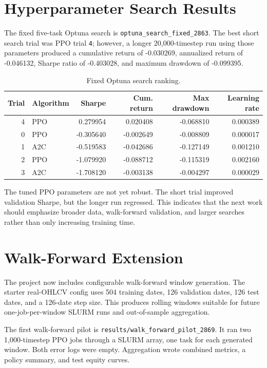 \documentclass[11pt]{article}
\begin{document}
\section{Hyperparameter Search Results}
The fixed five-task Optuna search is \texttt{optuna\_search\_fixed\_2863}. The best short search trial was PPO trial \texttt{4}; however, a longer 20,000-timestep run using those parameters produced a cumulative return of -0.030269, annualized return of -0.046132, Sharpe ratio of -0.403028, and maximum drawdown of -0.099395.

\begin{table}[h]
\centering
\caption{Fixed Optuna search ranking.}
\label{tab:optuna}
\begin{tabular}{rlrrrr}
\toprule
Trial & Algorithm & Sharpe & Cum. return & Max drawdown & Learning rate \\
\midrule
4 & PPO & 0.279954 & 0.020408 & -0.068810 & 0.000389 \\
0 & PPO & -0.305640 & -0.002649 & -0.008809 & 0.000017 \\
1 & A2C & -0.519583 & -0.042686 & -0.127149 & 0.001210 \\
2 & PPO & -1.079920 & -0.088712 & -0.115319 & 0.002160 \\
3 & A2C & -1.708120 & -0.003138 & -0.004297 & 0.000029 \\
\bottomrule
\end{tabular}
\end{table}

The tuned PPO parameters are not yet robust. The short trial improved validation Sharpe, but the longer run regressed. This indicates that the next work should emphasize broader data, walk-forward validation, and larger searches rather than only increasing training time.

\section{Walk-Forward Extension}
The project now includes configurable walk-forward window generation. The starter real-OHLCV config uses 504 training dates, 126 validation dates, 126 test dates, and a 126-date step size. This produces rolling windows suitable for future one-job-per-window SLURM runs and out-of-sample aggregation.

The first walk-forward pilot is \texttt{results/walk\_forward\_pilot\_2869}. It ran two 1,000-timestep PPO jobs through a SLURM array, one task for each generated window. Both error logs were empty. Aggregation wrote combined metrics, a policy summary, and test equity curves.
\end{document}
